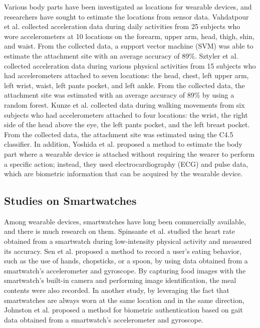 \documentclass{ieeeaccess}
\begin{document}
Various body parts have been investigated as locations for wearable devices, and researchers have sought to estimate the locations from sensor data. Vahdatpour et al. \cite{localization_vahdatpour} collected acceleration data during daily activities from 25 subjects who wore accelerometers at 10 locations on the forearm, upper arm, head, thigh, shin, and waist. From the collected data, a support vector machine (SVM) was able to estimate the attachment site with an average accuracy of 89\%. Sztyler et al. \cite{localization_sztyler} collected acceleration data during various physical activities from 15 subjects who had accelerometers attached to seven locations: the head, chest, left upper arm, left wrist, waist, left pants pocket, and left ankle. From the collected data, the attachment site was estimated with an average accuracy of 89\% by using a random forest. Kunze et al. \cite{localization_kunze} collected data during walking movements from six subjects who had accelerometers attached to four locations: the wrist, the right side of the head above the eye, the left pants pocket, and the left breast pocket. From the collected data, the attachment site was estimated using the C4.5 classifier. In addition, Yoshida et al. \cite{localization_yoshida} proposed a method to estimate the body part where a wearable device is attached without requiring the wearer to perform a specific action; instead, they used electrocardiography (ECG) and pulse data, which are biometric information that can be acquired by the wearable device.


\subsection{Studies on Smartwatches}
Among wearable devices, smartwatches have long been commercially available, and there is much research on them. Spinsante et al. \cite{accuracy_in_low_intensity} studied the heart rate obtained from a smartwatch during low-intensity physical activity and measured its accuracy. Sen et al. \cite{eating_recognition} proposed a method to record a user's eating behavior, such as the use of hands, chopsticks, or a spoon, by using data obtained from a smartwatch's accelerometer and gyroscope. By capturing food images with the smartwatch's built-in camera and performing image identification, the meal contents were also recorded. In another study, by leveraging the fact that smartwatches are always worn at the same location and in the same direction, Johnston et al. \cite{smartwatch_walk_authentication} proposed a method for biometric authentication based on gait data obtained from a smartwatch's accelerometer and gyroscope.\par
\end{document}

